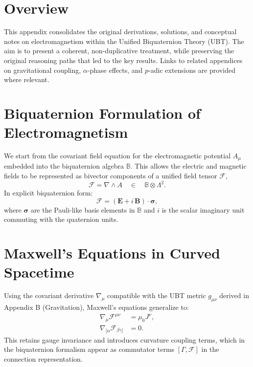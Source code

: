 

\section{Overview}
This appendix consolidates the original derivations, solutions, and conceptual notes on electromagnetism within the Unified Biquaternion Theory (UBT). The aim is to present a coherent, non-duplicative treatment, while preserving the original reasoning paths that led to the key results. Links to related appendices on gravitational coupling, $\alpha$-phase effects, and $p$-adic extensions are provided where relevant.

\section{Biquaternion Formulation of Electromagnetism}
We start from the covariant field equation for the electromagnetic potential $A_\mu$ embedded into the biquaternion algebra $\mathbb{B}$. This allows the electric and magnetic fields to be represented as bivector components of a unified field tensor $\mathcal{F}$,
\begin{equation}
    \mathcal{F} = \nabla \wedge A \quad \in \quad \mathbb{B} \otimes \Lambda^2.
\end{equation}
In explicit biquaternion form:
\begin{equation}
    \mathcal{F} = (\mathbf{E} + i\,\mathbf{B}) \cdot \boldsymbol{\sigma},
\end{equation}
where $\boldsymbol{\sigma}$ are the Pauli-like basis elements in $\mathbb{B}$ and $i$ is the scalar imaginary unit commuting with the quaternion units.

\section{Maxwell's Equations in Curved Spacetime}
Using the covariant derivative $\nabla_\mu$ compatible with the UBT metric $g_{\mu\nu}$ derived in Appendix B (Gravitation), Maxwell's equations generalize to:
\begin{align}
    \nabla_\mu \mathcal{F}^{\mu\nu} &= \mu_0 J^\nu, \\
    \nabla_{[\alpha} \mathcal{F}_{\beta\gamma]} &= 0.
\end{align}
This retains gauge invariance and introduces curvature coupling terms, which in the biquaternion formalism appear as commutator terms $[\Gamma, \mathcal{F}]$ in the connection representation.

